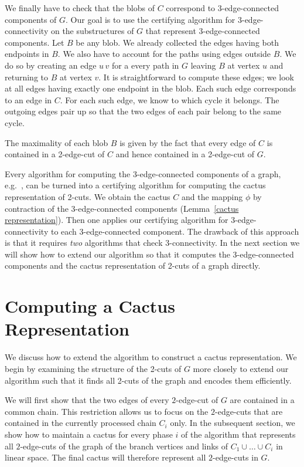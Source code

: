\documentclass[paper=a4]{scrartcl}
\newcommand{\edge}[2]{\ensuremath{#1\,#2}}
\begin{document}
We finally have to check that the blobs of $C$ correspond to 3-edge-connected components of $G$. Our goal is to use the certifying algorithm for $3$-edge-connectivity on the substructures of $G$ that represent $3$-edge-connected components. Let $B$ be any blob. We already collected the edges having both endpoints in $B$. We also have to account for the paths using edges outside $B$.  We do so by creating an edge $\edge uv$ for a every path in $G$ leaving $B$ at vertex $u$ and returning to $B$ at vertex $v$. 
It is straightforward to compute these edges; we look at all edges having exactly one endpoint in the blob. Each such edge corresponds to an edge in $C$. For each such edge, we know to which cycle it belongs. The outgoing edges pair up so that the two edges of each pair belong to the same cycle. 

The maximality of each blob $B$ is given by the fact that every edge of $C$ is contained in a 2-edge-cut of $C$ and hence contained in a 2-edge-cut of $G$.

Every algorithm for computing the 3-edge-connected components of a graph, e.g.~\cite{Nagamochi1992a,Taoka1992,Tsin2007,Tsin2009,Nagamochi-Ibaraki-Book}, can be turned into a certifying algorithm for computing the cactus representation of 2-cuts. We obtain the cactus $C$ and the mapping $\phi$ by contraction of the 3-edge-connected components (Lemma~\ref{cactus representation}). Then one applies our certifying algorithm for 3-edge-connectivity to each 3-edge-connected component. The drawback of this approach is that it requires  \emph{two} algorithms that check 3-connectivity. 
In the next section we will show how to extend our algorithm so that it computes the 3-edge-connected components and the cactus representation of 2-cuts of a graph directly.


\section{Computing a Cactus Representation}\label{Computing a Cactus}

We discuss how to extend the algorithm to construct a cactus representation. We begin by examining the structure of the 2-cuts of $G$ more closely to extend our algorithm such that it finds all 2-cuts of the graph and encodes them efficiently.

We will first show that the two edges of every $2$-edge-cut of $G$ are contained in a common chain. This restriction allows us to focus on the $2$-edge-cuts that are contained in the currently processed chain $C_i$ only. In the subsequent section, we show how to maintain a cactus for every phase $i$ of the algorithm that represents all $2$-edge-cuts of the graph of the branch vertices and links of $C_1 \cup \ldots \cup C_i$ in linear space. The final cactus will therefore represent all $2$-edge-cuts in $G$.
\end{document}
